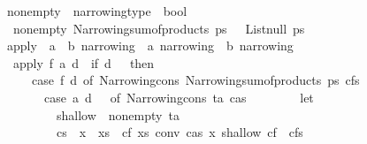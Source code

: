\begin{isabellebody}
\isanewline
{}\isamarkupfalse%
\ non{\isacharunderscore}{\kern0pt}empty\ {\isacharcolon}{\kern0pt}{\isacharcolon}{\kern0pt}\ {\isachardoublequoteopen}narrowing{\isacharunderscore}{\kern0pt}type\ {\isacharequal}{\kern0pt}{\isachargreater}{\kern0pt}\ bool{\isachardoublequoteclose}\isanewline
{}\isanewline
\ \ {\isachardoublequoteopen}non{\isacharunderscore}{\kern0pt}empty\ {\isacharparenleft}{\kern0pt}Narrowing{\isacharunderscore}{\kern0pt}sum{\isacharunderscore}{\kern0pt}of{\isacharunderscore}{\kern0pt}products\ ps{\isacharparenright}{\kern0pt}\ {\isacharequal}{\kern0pt}\ {\isacharparenleft}{\kern0pt}{\isasymnot}\ {\isacharparenleft}{\kern0pt}List{\isachardot}{\kern0pt}null\ ps{\isacharparenright}{\kern0pt}{\isacharparenright}{\kern0pt}{\isachardoublequoteclose}\isanewline
\isanewline
{}\isamarkupfalse%
\ {\isachardoublequoteopen}apply{\isachardoublequoteclose}\ {\isacharcolon}{\kern0pt}{\isacharcolon}{\kern0pt}\ {\isachardoublequoteopen}{\isacharparenleft}{\kern0pt}{\isacharprime}{\kern0pt}a\ {\isacharequal}{\kern0pt}{\isachargreater}{\kern0pt}\ {\isacharprime}{\kern0pt}b{\isacharparenright}{\kern0pt}\ narrowing\ {\isacharequal}{\kern0pt}{\isachargreater}{\kern0pt}\ {\isacharprime}{\kern0pt}a\ narrowing\ {\isacharequal}{\kern0pt}{\isachargreater}{\kern0pt}\ {\isacharprime}{\kern0pt}b\ narrowing{\isachardoublequoteclose}\isanewline
{}\isanewline
\ \ {\isachardoublequoteopen}apply\ f\ a\ d\ {\isacharequal}{\kern0pt}\ {\isacharparenleft}{\kern0pt}if\ d\ {\isachargreater}{\kern0pt}\ {}\ then\isanewline
\ \ \ \ \ {\isacharparenleft}{\kern0pt}case\ f\ d\ of\ Narrowing{\isacharunderscore}{\kern0pt}cons\ {\isacharparenleft}{\kern0pt}Narrowing{\isacharunderscore}{\kern0pt}sum{\isacharunderscore}{\kern0pt}of{\isacharunderscore}{\kern0pt}products\ ps{\isacharparenright}{\kern0pt}\ cfs\ {\isasymRightarrow}\isanewline
\ \ \ \ \ \ \ case\ a\ {\isacharparenleft}{\kern0pt}d\ {\isacharminus}{\kern0pt}\ {}{\isacharparenright}{\kern0pt}\ of\ Narrowing{\isacharunderscore}{\kern0pt}cons\ ta\ cas\ {\isasymRightarrow}\isanewline
\ \ \ \ \ \ \ let\isanewline
\ \ \ \ \ \ \ \ \ shallow\ {\isacharequal}{\kern0pt}\ non{\isacharunderscore}{\kern0pt}empty\ ta{\isacharsemicolon}{\kern0pt}\isanewline
\ \ \ \ \ \ \ \ \ cs\ {\isacharequal}{\kern0pt}\ {\isacharbrackleft}{\kern0pt}{\isacharparenleft}{\kern0pt}{\isasymlambda}{\isacharparenleft}{\kern0pt}x\ {\isacharhash}{\kern0pt}\ xs{\isacharparenright}{\kern0pt}\ {\isasymRightarrow}\ cf\ xs\ {\isacharparenleft}{\kern0pt}conv\ cas\ x{\isacharparenright}{\kern0pt}{\isacharparenright}{\kern0pt}{\isachardot}{\kern0pt}\ shallow{\isacharcomma}{\kern0pt}\ cf\ {\isasymleftarrow}\ cfs{\isacharbrackright}{\kern0pt}\isanewline

\end{isabellebody}
